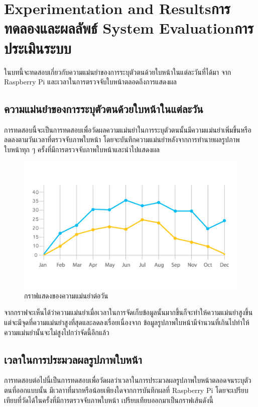 \chapter{\ifproject%
\ifenglish Experimentation and Results\else การทดลองและผลลัพธ์\fi
\else%
\ifenglish System Evaluation\else การประเมินระบบ\fi
\fi}

ในบทนี้จะทดสอบเกี่ยวกับความแม่นยำของการระบุตัวตนด้วยใบหน้าในแต่ละวันที่ได้มา
จาก Raspberry Pi และเวลาในการตรวจจับใบหน้าตลอดถึงการแสดงผล

\section{ความแม่นยำของการระบุตัวตนด้วยใบหน้าในแต่ละวัน}
การทดสอบนี้จะเป็นการทดสอบเพื่อวัดผลความแม่นยำในการระบุตัวตนนั้นมีความแม่นยำเพิ่มขึ้นหรือลดลงตามวันเวลาที่ตรวจจับภาพใบหน้า
โดยจะบันทึกความแม่นยำหลังจากการทำนายผลรูปภาพใบหน้าทุก ๆ ครั้งที่มีการตรวจจับภาพใบหน้าและนำไปแสดงผล

\begin{figure}[!ht]
    \begin{center}
      \includegraphics[scale=.7]{pic/graph_acc.jpg}
      \caption[Poem]{กราฟแสดงของความแม่นยำต่อวัน}
      \label{fig:acc_graph}
    \end{center}
  \end{figure}

\indent จากกราฟจะเห็นได้ว่าความแม่นยำเมื่อเวลาในการจัดเก็บข้อมูลนั้นมากขึ้นก็จะทำให้ความแม่นยำสูงขึ้น แต่จะมีจุดที่ความแม่นยำสูงที่สุดและลดลงเรื่อยเนื่องจาก
ข้อมูลรูปภาพใบหน้ามีจำนวนที่เกินไปทำให้ความแม่นยำนั้นจะไม่สูงไปกว่าจัดนี้อีกแล้ว

  \section{เวลาในการประมวลผลรูปภาพใบหน้า}
  การทดสอบต่อไปนี้เป็นการทดสอบเพื่อวัดผลว่าเวลาในการประมวลผลรูปภาพใบหน้าตลอดจนระบุตัวตนที่ออกแบบนั้น
  มีเวลาาที่มากหรือน้อยเพียงใดจากการบันทึกผลที่ Raspberry Pi โดยจะเปรียบเทียบที่วัดได้ในครั้งที่มีการตรวจจับภาพใบหน้า
  เปรียบเทียบออกมาเป็นกราฟเส้นดังนี้
  
